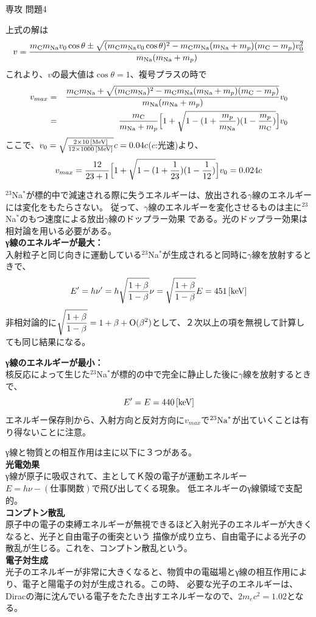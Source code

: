 \documentclass[fleqn]{jbook}
\begin{document}
\begin{answer}{専攻 問題4}{}
\begin{subanswers}
\begin{subsubanswers}
上式の解は
\[
v=\frac{m_{\rm{C}} m_{{\rm{Na}}}v_0\cos\theta\pm\sqrt{(m_{\rm{C}} m_{{\rm{Na}}}v_0 \cos\theta)^2-m_{\rm{C}} m_{{\rm{Na}}}(m_{{\rm{Na}}}+m_{p})(m_{\rm{C}}-m_p)v_0^2}}{m_{{\rm{Na}}}(m_{{\rm{Na}}}+m_p)}
\]
これより、$v$の最大値は$\cos\theta=1$、複号プラスの時で
\begin{eqnarray*}
v_{max}&=&\frac{m_{\rm{C}} m_{{\rm{Na}}}+\sqrt{(m_{\rm{C}} m_{{\rm{Na}}})^2-m_{\rm{C}} m_{{\rm{Na}}}(m_{{\rm{Na}}}+m_p)(m_{\rm{C}}-m_p)}}{m_{{\rm{Na}}}(m_{{\rm{Na}}}+m_p)}v_0\\
       &=&\frac{m_{\rm{C}}}{m_{{\rm{Na}}}+m_p}\Bigl[1+\sqrt{1-(1+\frac{m_p}{m_{{\rm{Na}}}})(1-\frac{m_p}{m_{\rm{C}}})}\Bigr] v_0
\end{eqnarray*}
ここで、$v_0=\sqrt{\frac{2\times 10{\,{\rm [MeV]}}}{12\times 1000{\,{\rm [MeV]}}}}c=0.04c$($c$:光速)より、
\[
v_{max}=\frac{12}{23+1}\Bigl[1+\sqrt{1-(1+\frac{1}{23})(1-\frac{1}{12})}\Bigr]v_0=0.024c
\]

\SubSubAnswer
$^{23}${\rm{Na}}$^{*}$が標的中で減速される際に失うエネルギーは、放出される$\gamma$線のエネルギーには変化をもたらさない。
従って、$\gamma$線のエネルギーを変化させるものは主に$^{23}${\rm{Na}}$^{*}$のもつ速度による放出$\gamma$線のドップラー効果
である。光のドップラー効果は相対論を用いる必要がある。\\

{\bf γ線のエネルギーが最大：}\\
入射粒子と同じ向きに運動している$^{23}${\rm{Na}}$^{*}$が生成されると同時に$\gamma$線を放射するときで、
\[
E'=h\nu'=h\sqrt{\frac{1+\beta}{1-\beta}}\nu=\sqrt{\frac{1+\beta}{1-\beta}}E=451{\,{\rm [keV]}}
\]
非相対論的に$\displaystyle{\sqrt{\frac{1+\beta}{1-\beta}}}=1+\beta+{\rm{O}}(\beta^2)$として、２次以上の項を無視して計算しても同じ結果になる。
\bigskip

{\bf γ線のエネルギーが最小：}\\
核反応によって生じた$^{23}${\rm{Na}}$^{*}$が標的の中で完全に静止した後に$\gamma$線を放射するときで、
\[
E'=E=440{\,{\rm [keV]}}
\]
エネルギー保存則から、入射方向と反対方向に$v_{max}$で$^{23}{\rm{Na}}^{*}$が出ていくことは有り得ないことに注意。

\SubSubAnswer
γ線と物質との相互作用は主に以下に３つがある。\\
{\bf 光電効果\\}
γ線が原子に吸収されて、主としてＫ殻の電子が運動エネルギー$E=h\nu-(仕事関数)$で飛び出してくる現象。
低エネルギーのγ線領域で支配的。
\\
{\bf コンプトン散乱\\}
原子中の電子の束縛エネルギーが無視できるほど入射光子のエネルギーが大きくなると、光子と自由電子の衝突という
描像が成り立ち、自由電子による光子の散乱が生じる。これを、コンプトン散乱という。
\\
{\bf 電子対生成\\}
光子のエネルギーが非常に大きくなると、物質中の電磁場とγ線の相互作用により、電子と陽電子の対が生成される。この時、
必要な光子のエネルギーは、Diracの海に沈んでいる電子をたたき出すエネルギーなので、$2m_e c^2=1.02${\Unit{[MeV]}}となる。


\end{subsubanswers}
\end{subanswers}
\end{answer}
\end{document}
